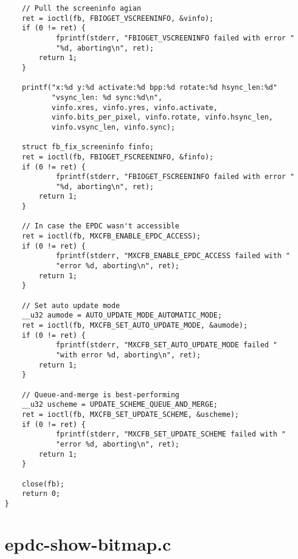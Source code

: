 \documentclass{memoir}
\begin{document}
\begin{verbatim}
	// Pull the screeninfo agian
	ret = ioctl(fb, FBIOGET_VSCREENINFO, &vinfo);
	if (0 != ret) {
	        fprintf(stderr, "FBIOGET_VSCREENINFO failed with error "
			"%d, aborting\n", ret);
		return 1;
	}

	printf("x:%d y:%d activate:%d bpp:%d rotate:%d hsync_len:%d"
	       "vsync_len: %d sync:%d\n",
	       vinfo.xres, vinfo.yres, vinfo.activate,
	       vinfo.bits_per_pixel, vinfo.rotate, vinfo.hsync_len,
	       vinfo.vsync_len, vinfo.sync);

	struct fb_fix_screeninfo finfo;
	ret = ioctl(fb, FBIOGET_FSCREENINFO, &finfo);
	if (0 != ret) {
	        fprintf(stderr, "FBIOGET_FSCREENINFO failed with error "
			"%d, aborting\n", ret);
		return 1;
	}

	// In case the EPDC wasn't accessible
	ret = ioctl(fb, MXCFB_ENABLE_EPDC_ACCESS);
	if (0 != ret) {
	        fprintf(stderr, "MXCFB_ENABLE_EPDC_ACCESS failed with "
			"error %d, aborting\n", ret);
		return 1;
	}

	// Set auto update mode
	__u32 aumode = AUTO_UPDATE_MODE_AUTOMATIC_MODE;
	ret = ioctl(fb, MXCFB_SET_AUTO_UPDATE_MODE, &aumode);
	if (0 != ret) {
	        fprintf(stderr, "MXCFB_SET_AUTO_UPDATE_MODE failed "
			"with error %d, aborting\n", ret);
		return 1;
	}

	// Queue-and-merge is best-performing
	__u32 uscheme = UPDATE_SCHEME_QUEUE_AND_MERGE;
	ret = ioctl(fb, MXCFB_SET_UPDATE_SCHEME, &uscheme);
	if (0 != ret) {
	        fprintf(stderr, "MXCFB_SET_UPDATE_SCHEME failed with "
			"error %d, aborting\n", ret);
		return 1;
	}

	close(fb);
	return 0;
}

\end{verbatim}





\chapter{epdc-show-bitmap.c}
\label{epdc-show-bitmap.c}
\end{document}
